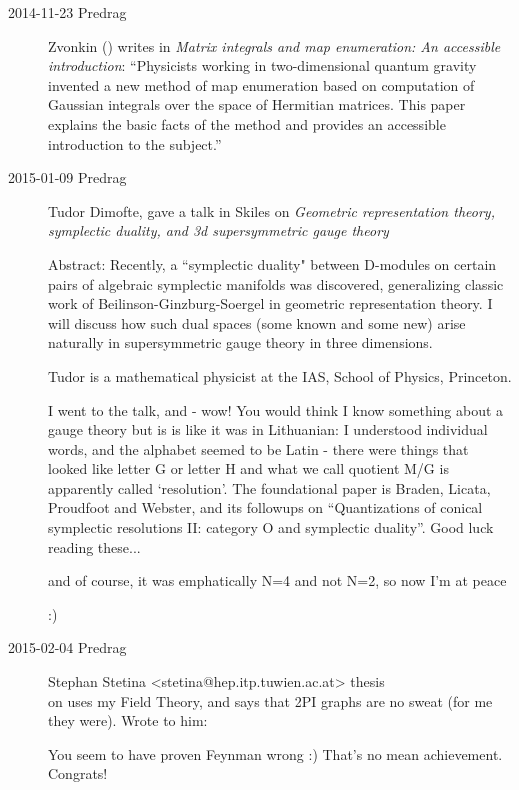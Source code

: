 \begin{description}
\item[2014-11-23 Predrag]
Zvonkin
()
writes in
{\em Matrix integrals and map enumeration: {An} accessible introduction}:
``Physicists working in two-dimensional quantum gravity invented a new
method of map enumeration based on computation of Gaussian integrals over
the space of Hermitian matrices. This paper explains the basic facts of
the method and provides an accessible introduction to the subject.''

\item[2015-01-09 Predrag]

Tudor Dimofte, gave a talk in Skiles on
{\em Geometric representation theory, symplectic duality, and 3d
supersymmetric gauge theory}

Abstract: Recently, a ``symplectic duality" between D-modules on certain
pairs of algebraic symplectic manifolds was discovered, generalizing
classic work of Beilinson-Ginzburg-Soergel in geometric representation
theory. I will discuss how such dual spaces (some known and some new) arise
naturally in supersymmetric gauge theory in three dimensions.

Tudor is a mathematical physicist at the IAS,
School of Physics, Princeton.

I went to the talk, and - wow! You would think I know something about a
gauge theory but is is like it was in Lithuanian: I understood individual
words, and the alphabet seemed to be Latin - there were things that
looked like letter G or letter H and what we call quotient M/G is
apparently called `resolution'. The foundational paper is Braden, Licata,
Proudfoot and Webster, and its followups on
``Quantizations of conical symplectic resolutions II: category O and
symplectic duality''. Good luck reading these...

and of course, it was emphatically N=4 and not N=2, so now I'm at peace

:)

\item[2015-02-04 Predrag] Stephan Stetina
    <stetina@hep.itp.tuwien.ac.at> thesis \\
    on  uses my
     {Field Theory}, and says
    that 2PI graphs are no sweat (for me they were). Wrote to him:

You seem to have
{proven Feynman wrong} :) That's no mean achievement. Congrats!


\end{description}
